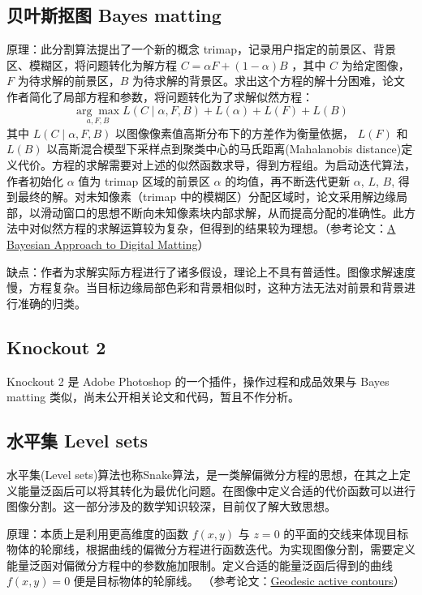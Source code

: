 \documentclass[lang=cn,11pt,a4paper]{elegantpaper}
\begin{document}
\subsection{贝叶斯抠图 Bayes matting}

原理：此分割算法提出了一个新的概念 trimap，记录用户指定的前景区、背景区、模糊区，将问题转化为解方程 $C=\alpha F+(1-\alpha) B$ ，其中 $C$ 为给定图像， $F$ 为待求解的前景区，$B$ 为待求解的背景区。求出这个方程的解十分困难，论文作者简化了局部方程和参数，将问题转化为了求解似然方程：
\begin{equation}
    \underset{a, F, B}{\arg \max } L(C \mid \alpha, F, B)+L(\alpha)+L(F)+L(B)
\end{equation}
其中 $L(C \mid \alpha, F, B)$ 以图像像素值高斯分布下的方差作为衡量依据， $L(F)$ 和 $L(B)$ 以高斯混合模型下采样点到聚类中心的马氏距离(Mahalanobis distance)定义代价。方程的求解需要对上述的似然函数求导，得到方程组。为启动迭代算法，作者初始化 $\alpha$ 值为 trimap 区域的前景区 $\alpha$ 的均值，再不断迭代更新 $\alpha$, $L$, $B$, 得到最终的解。对未知像素（trimap 中的模糊区）分配区域时，论文采用解边缘局部，以滑动窗口的思想不断向未知像素块内部求解，从而提高分配的准确性。此方法中对似然方程的求解运算较为复杂，但得到的结果较为理想。（参考论文：\href{https://grail.cs.washington.edu/projects/digital-matting/papers/cvpr2001.pdf}{A Bayesian Approach to Digital Matting}）

缺点：作者为求解实际方程进行了诸多假设，理论上不具有普适性。图像求解速度慢，方程复杂。当目标边缘局部色彩和背景相似时，这种方法无法对前景和背景进行准确的归类。

\subsection{Knockout 2}

Knockout 2 是 Adobe Photoshop 的一个插件，操作过程和成品效果与 Bayes matting 类似，尚未公开相关论文和代码，暂且不作分析。

\subsection{水平集 Level sets}

水平集(Level sets)算法也称Snake算法，是一类解偏微分方程的思想，在其之上定义能量泛函后可以将其转化为最优化问题。在图像中定义合适的代价函数可以进行图像分割。这一部分涉及的数学知识较深，目前仅了解大致思想。

原理：本质上是利用更高维度的函数 $f(x,y)$ 与 $z=0$ 的平面的交线来体现目标物体的轮廓线，根据曲线的偏微分方程进行函数迭代。为实现图像分割，需要定义能量泛函对偏微分方程中的参数施加限制。定义合适的能量泛函后得到的曲线 $f(x,y)=0$ 便是目标物体的轮廓线。 （参考论文：\href{https://link.springer.com/article/10.1023/A:1007979827043}{Geodesic active contours}）
\end{document}
